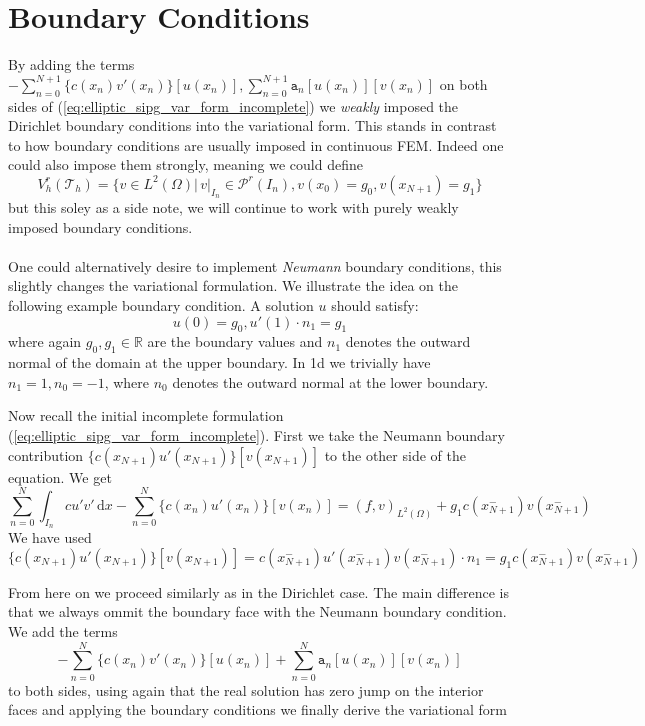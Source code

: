 \section{Boundary Conditions}
By adding the terms $-\sum_{n=0}^{N+1} \{c(x_n)v'(x_n)\}[u(x_n)], \sum_{n=0}^{N+1} \texttt{a}_n[u(x_n)][v(x_n)]$ on both sides
of (\ref{eq:elliptic_sipg_var_form_incomplete}) we \textit{weakly} imposed the Dirichlet
boundary conditions into the variational form. This stands in contrast to how boundary 
conditions are usually imposed in continuous FEM. Indeed one could also impose them strongly,
meaning we could define 
\begin{equation*}
    V_h^r(\mathcal{T}_h) = \{v \in L^2(\Omega) |\, v|_{I_n} \in \mathcal{P}^r(I_n), v(x_0)=g_0, v(x_{N+1})=g_1 \}
\end{equation*}
but this soley as a side note, we will continue to work with purely weakly imposed 
boundary conditions.  \\ \\

One could alternatively desire to implement \textit{Neumann} boundary conditions, this slightly changes the variational formulation.
We illustrate the idea on the following example boundary condition. A solution
$u$ should satisfy:
\[
    u(0) = g_{0}, u'(1)\cdot n_1 = g_{1}
\]
where again $g_0, g_1 \in \mathbb{R}$ are the boundary values and $n_1$ denotes the outward normal
of the domain at the upper boundary. In 1d we trivially have $n_1 = 1, n_0 = -1$, where $n_0$ denotes the outward 
normal at the lower boundary.

Now recall the initial incomplete formulation (\ref{eq:elliptic_sipg_var_form_incomplete}). First we take the 
Neumann boundary contribution $\{c(x_{N+1})u'(x_{N+1})\}[v(x_{N+1})]$ to the other side of the equation. We get 
\[
    \sum_{n=0}^N \int_{I_n} cu'v'\, \text{d}x 
    -\sum_{n=0}^{N} \{c(x_n)u'(x_n)\}[v(x_n)] = (f,v)_{L^2(\Omega)}
    + g_1c(x_{N+1}^-)v(x_{N+1}^-)
\]
We have used $\{c(x_{N+1})u'(x_{N+1})\}[v(x_{N+1})] = c(x_{N+1}^-)u'(x_{N+1}^-)v(x_{N+1}^-)\cdot n_1 = g_1 c(x_{N+1}^-)v(x_{N+1}^-)$

From here on 
we proceed similarly as in the Dirichlet case. The main difference is that we always ommit the boundary face with the Neumann
boundary condition. \\
We add the terms 
\[
    -\sum_{n=0}^{N} \{c(x_n)v'(x_n)\}[u(x_n)] 
    +\sum_{n=0}^{N} \texttt{a}_n[u(x_n)][v(x_n)]
\]
to both sides, using again that the real solution has zero jump on the interior faces and 
applying the boundary conditions we finally derive the variational form

